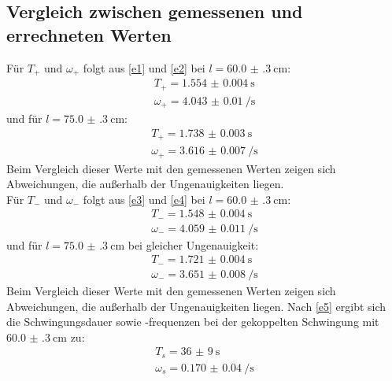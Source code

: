 \subsection{Vergleich zwischen gemessenen und errechneten Werten}
Für $T_+ \text{ und } \omega_+$ folgt aus \eqref{e1} und \eqref{e2} bei $l = \SI{60.0(3)}{\centi\metre}$:
\begin{equation*}
  \begin{split}
  T_+ = \SI{1.554(4)}{\second} \\
  \omega_+ = \SI{4.043(10)}{\per\second}
  \end{split}
\end{equation*}
und für $l = \SI{75.0(3)}{\centi\metre}$:
\begin{equation*}
  \begin{split}
      T_+ = \SI{1.738(3)}{\second} \\
      \omega_+ = \SI{3.616(7)}{\per\second}
  \end{split}
\end{equation*}
Beim Vergleich dieser Werte mit den gemessenen Werten zeigen sich Abweichungen, die außerhalb der Ungenauigkeiten liegen.
\\
Für $T_- \text{ und } \omega_-$ folgt aus \eqref{e3} und \eqref{e4} bei $l = \SI{60.0(3)}{\centi\metre}$:
\begin{equation*}
  \begin{split}
  T_- = \SI{1.548(4)}{\second} \\
  \omega_- = \SI{4.059(11)}{\per\second}
  \end{split}
\end{equation*}
und für $l = \SI{75.0(3)}{\centi\metre}$ bei gleicher Ungenauigkeit:
\begin{equation*}
  \begin{split}
      T_- = \SI{1.721(4)}{\second} \\
      \omega_- = \SI{3.651(8)}{\per\second}
  \end{split}
\end{equation*}
Beim Vergleich dieser Werte mit den gemessenen Werten zeigen sich Abweichungen, die außerhalb der Ungenauigkeiten liegen.
Nach \eqref{e5} ergibt sich die Schwingungsdauer sowie -frequenzen bei der gekoppelten Schwingung mit $\SI{60.0(3)}{\centi\metre}$ zu:
\begin{equation*}
  \begin{split}
  T_s = \SI{36(9)}{\second} \\
  \omega_s = \SI{0.170(40)}{\per\second}
  \end{split}
\end{equation*}
